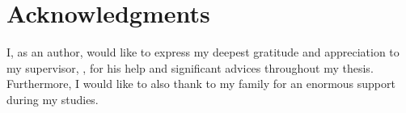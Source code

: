 \section*{Acknowledgments}
I, as an author, would like to express my deepest gratitude and appreciation to my supervisor, \Supervisor, for his help and significant advices throughout my thesis. Furthermore, I would like to also thank to my family for an enormous support during my studies.

\vfill